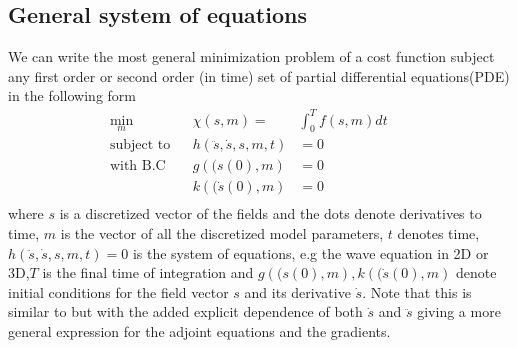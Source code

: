 \documentclass[10pt]{SelfArx} %
\theoremstyle{definition}
\begin{document}
\subsection{General system of equations}
\label{sec:general_system}
We can write the most general minimization problem of a cost function subject any first order or second order (in time) set of partial differential equations(PDE) in the following form
\begin{equation}
\label{eq:general_system}
\begin{aligned}
\underset{m}{\text{min}} &&  \chi\left(s,m\right) = &  \int_0^T f\left(s,m\right) dt & &\\
\text{subject to} & & h\left(\ddot{s}, \dot{s}, s, m, t\right) & =  0 \\
 \text{with B.C} & & g\left((s\left(0\right), m\right) & = 0 \\
 & & k\left((\dot{s}\left(0\right), m\right) & = 0 \\
\end{aligned}
\end{equation}
where $s$ is a discretized vector of the fields and the dots denote derivatives to time, $m$ is the vector of all the discretized model parameters, $t$ denotes time, $h\left(\ddot{s}, \dot{s}, s, m, t\right)  =  0$ is the system of equations, e.g the wave equation in 2D or 3D,$T$ is the final time of integration and $g\left((s\left(0\right), m\right), k\left((\dot{s}\left(0\right), m\right)$ denote initial conditions for the field vector $s$ and its derivative $\dot{s}$. Note that this is similar to \cite{Bradley2012} but with the added explicit dependence of both $\dot s$ and $\ddot s$ giving a more general expression for the adjoint equations and the gradients. 
\end{document}
